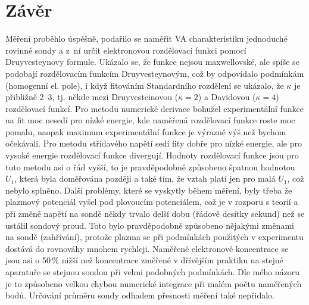 \documentclass[12pt]{article}
\begin{document}
\section{Závěr}
Měření proběhlo úspěšně, podařilo se naměřit VA charakteristiku jednoduché rovinné sondy a z~ní určit elektronovou rozdělovací funkci pomocí Druyvesteynovy formule. Ukázalo se, že funkce nejsou maxwellovské, ale spíše se podobají rozdělovacím funkcím Druyvesteynovým, což by odpovídalo podmínkám (homogenní el. pole), i když fitováním Standardního rozdělení se ukázalo, že $\kappa$ je přibližně 2--3, tj. někde mezi Druyvesteinovou ($\kappa = 2$) a Davidovou ($\kappa=4$) rozdělovací funkcí. Pro metodu numerické derivace bohužel experimentální funkce na fit moc nesedí pro nízké energie, kde naměřená rozdělovací funkce roste moc pomalu, naopak maximum  experimentální funkce je výrazně výš než bychom očekávali. Pro metodu střídavého napětí sedí fity dobře pro nízké energie, ale pro vysoké energie rozdělovací funkce divergují. Hodnoty rozdělovací funkce jsou pro tuto metodu asi o řád vyšší, to je pravděpodobně způsobeno špatnou hodnotou $U_1$, která byla doměřována později a také tím, že vztah platí jen pro malá $U_1$, což nebylo splněno. Další problémy, které se vyskytly během měření, byly třeba že  plazmový potenciál vyšel pod plovoucím potenciálem, což je v rozporu s teorií a při změně napětí na sondě někdy trvalo delší dobu (řádově desítky sekund) než se ustálil sondový proud. Toto bylo pravděpodobně způsobeno nějakými změnami na sondě (zahřívání), protože plazma se při podmínkách použitých v experimentu dostává do rovnováhy mnohem rychleji. Naměřené elektronové koncentrace se jsou asi o 50\,\% nižší než koncentrace změřené v dřívějším praktiku na stejné aparatuře se stejnou sondou při velmi podobných podmínkách. Dle mého názoru je to způsobeno velkou chybou numerické integrace při malém počtu naměřených bodů. Určování průměru sondy odhadem přesnosti měření také nepřidalo. 
\end{document}
